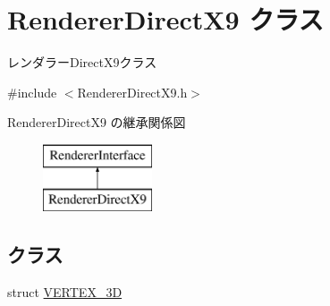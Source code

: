 \hypertarget{class_renderer_direct_x9}{}\section{Renderer\+Direct\+X9 クラス}
\label{class_renderer_direct_x9}


レンダラー\+Direct\+X9クラス  




{\ttfamily \#include $<$Renderer\+Direct\+X9.\+h$>$}

Renderer\+Direct\+X9 の継承関係図\begin{figure}[H]
\begin{center}
\leavevmode
\includegraphics[height=2.000000cm]{class_renderer_direct_x9}
\end{center}
\end{figure}
\subsection*{クラス}
\begin{DoxyCompactItemize}
\item 
struct \mbox{\hyperlink{struct_renderer_direct_x9_1_1_v_e_r_t_e_x__3_d}{V\+E\+R\+T\+E\+X\+\_\+3D}}
\end{DoxyCompactItemize}
